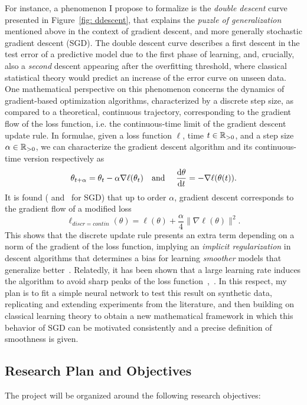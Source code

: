 \documentclass[reqno]{amsart}
\begin{document}
For instance, a phenomenon I propose to formalize is the {\it\/double descent} curve presented in Figure~\ref{fig: ddescent}, that explains the {\it\/puzzle of generalization} mentioned above in the context of gradient descent, and more generally stochastic gradient descent (SGD). The double descent curve describes a first descent in the test error of a predictive model due to the first phase of learning, and, crucially, also a {\it\/second} descent appearing after the overfitting threshold, where classical statistical theory would predict an increase of the error curve on unseen data. One mathematical perspective on this phenomenon concerns the dynamics of gradient-based optimization algorithms, characterized by a discrete step size, as compared to a theoretical, continuous trajectory, corresponding to the gradient flow of the loss function, i.e. the continuous-time limit of the gradient descent update rule. In formulae, given a loss function $\ell$, time $t\in\mathbb{R}_{>0}$, and a step size $\alpha\in\mathbb{R}_{>0}$, we can characterize the gradient descent algorithm and its continuous-time version respectively as
\[
\theta_{t+\alpha}=\theta_t - \alpha \nabla\ell(\theta_t)\quad \text{and }\quad \frac{\mathrm{d} \theta}{\mathop{}\!\mathrm{d} t} = -\nabla\ell(\theta(t)).
\]
It is found (\cite{barrett} and~\cite{smith} for SGD) that up to order $\alpha$, gradient descent corresponds to the gradient flow of a modified loss
\begin{equation}
\ell_{discr=contin}(\theta) =\ell(\theta)+\frac{\alpha}{4}\big\lVert\nabla\ell(\theta)\big\rVert^2.
\end{equation}
This shows that the discrete update rule presents an extra term depending on a norm of the gradient of the loss function, implying an {\it\/implicit regularization} in descent algorithms that determines a bias for learning {\it\/smoother} models that generalize better~\cite{prince}. Relatedly, it has been shown that a large learning rate induces the algorithm to avoid sharp peaks of the loss function~\cite{jastrzkebski},~\cite{cohen}. In this respect, my plan is to fit a simple neural network to test this result on synthetic data, replicating and extending experiments from the literature, and then building on classical learning theory to obtain a new mathematical framework in which this behavior of SGD can be motivated consistently and a precise definition of smoothness is given. 

\subsection{Research Plan and Objectives}
The project will be organized around the following research objectives:
\end{document}
